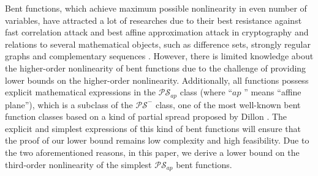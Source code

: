 \documentclass{article}
\newcommand{\0}{\textbf{0}}
\newcommand{\1}{\textbf{1}}
\theoremstyle{plain}
\begin{document}
    Bent functions, which achieve maximum possible nonlinearity in even number of variables,
    have attracted a lot of researches due to their best resistance against fast correlation attack \cite{MS1988fast_correlation_attack} and best affine approximation attack \cite{DingXS1991book} in cryptography and relations to several mathematical objects, such as difference sets, strongly regular graphs and complementary sequences \cite{Carlet2020book}.
    However, there is limited knowledge about the higher-order nonlinearity of bent functions due to the challenge of providing lower bounds on the higher-order nonlinearity.
    Additionally, all functions possess explicit mathematical expressions in the $\mathcal{PS}_{ap}$ class  (where ``$ap$ '' means ``affine plane''), which is a subclass of the $\mathcal{PS}^-$ class, one of the most well-known bent function classes based on a kind of partial spread proposed by Dillon \cite{Dillon1974PSbent}.
    The explicit and simplest expressions of this kind of bent functions will ensure that the proof of our lower bound remains low complexity and high feasibility. 
    Due to the two aforementioned reasons, 
    in this paper, we derive a lower bound on the third-order nonlinearity of the simplest $\mathcal{PS}_{ap}$ bent functions.
\end{document}
